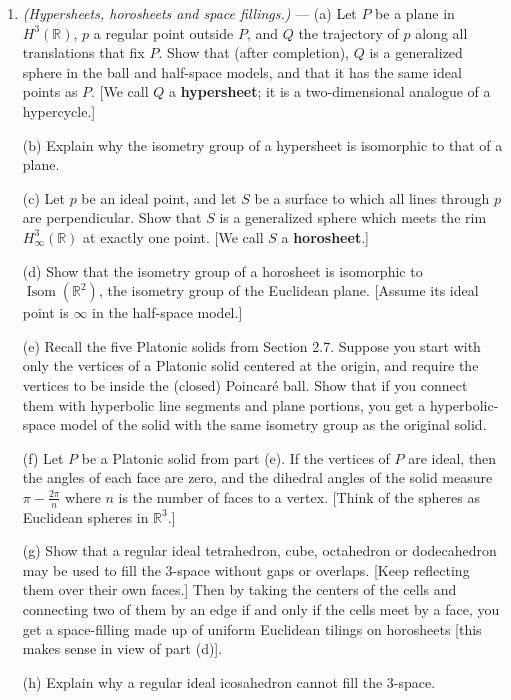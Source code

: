 \documentclass[leqno]{book}
\begin{document}
\begin{enumerate}
\item\emph{(Hypersheets, horosheets and space fillings.)} \---- (a) Let $P$ be a plane in $H^3(\mathbb R)$, $p$ a regular point outside $P$, and $Q$ the trajectory of $p$ along all translations that fix $P$.  Show that (after completion), $Q$ is a generalized sphere in the ball and half-space models, and that it has the same ideal points as $P$.  [We call $Q$ a \textbf{hypersheet}; it is a two-dimensional analogue of a hypercycle.]

(b) Explain why the isometry group of a hypersheet is isomorphic to that of a plane.

(c) Let $p$ be an ideal point, and let $S$ be a surface to which all lines through $p$ are perpendicular.  Show that $S$ is a generalized sphere which meets the rim $H^3_\infty(\mathbb R)$ at exactly one point.  [We call $S$ a \textbf{horosheet}.]

(d) Show that the isometry group of a horosheet is isomorphic to $\operatorname{Isom}(\mathbb R^2)$, the isometry group of the Euclidean plane. [Assume its ideal point is $\infty$ in the half-space model.] %

(e) Recall the five Platonic solids from Section 2.7.  Suppose you start with only the vertices of a Platonic solid centered at the origin, and require the vertices to be inside the (closed) Poincar\'e ball.  Show that if you connect them with hyperbolic line segments and plane portions, you get a hyperbolic-space model of the solid with the same isometry group as the original solid. %

(f) Let $P$ be a Platonic solid from part (e).  If the vertices of $P$ are ideal, then the angles of each face are zero, and the dihedral angles of the solid measure $\pi-\frac{2\pi}n$ where $n$ is the number of faces to a vertex.  [Think of the spheres as Euclidean spheres in $\mathbb R^3$.]

(g) Show that a regular ideal tetrahedron, cube, octahedron or dodecahedron may be used to fill the $3$-space without gaps or overlaps.  [Keep reflecting them over their own faces.]  Then by taking the centers of the cells and connecting two of them by an edge if and only if the cells meet by a face, you get a space-filling made up of uniform Euclidean tilings on horosheets [this makes sense in view of part (d)].

(h) Explain why a regular ideal icosahedron cannot fill the $3$-space.
\end{enumerate}
\end{document}
